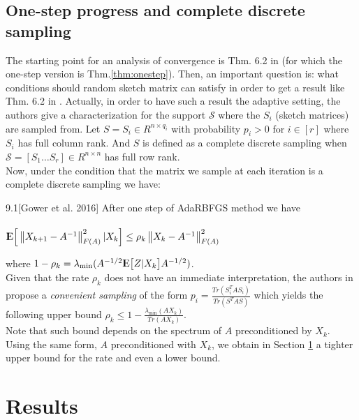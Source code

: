 \documentclass[12pt,conference,compsocconf]{IEEEtran}
\newcommand\norm[1]{\left\lVert#1\right\rVert}
\newcommand{\E}{{\rm I\kern-.3em E}}
\begin{document}
\subsection{One-step progress and complete discrete sampling}
The starting point for an analysis of convergence is Thm. 6.2 in \cite{Gower1} (for which the one-step version is Thm.\ref{thm:onestep}). Then, an important question is: what conditions should random sketch matrix can satisfy in order to get a result like Thm. 6.2 in \cite{Gower1}. Actually, in order to have such a result the adaptive setting, the authors give a characterization for the support $\mathcal{S}$ where the $S_i$ (sketch matrices) are sampled from. Let $S=S_i\in R^{n\times q_i}$ with probability $p_i>0$ for $i \in [r]$ where $S_i$ has full column rank. And $S$ is defined as a complete discrete sampling when $\mathcal{S}=[S_1\ldots S_r]\in R^{n\times n}$ has full row rank.\\
Now, under the condition that the matrix we sample at each iteration is a complete discrete sampling we have:
\begin{customthm}{9.1}[Gower et al. 2016]\label{thm:onestep}
After one step of AdaRBFGS method we have\\
\\
$\E\Big[\norm{X_{k+1}-A^{-1}}^2_{F(A)}|X_k\Big] \leq \rho _k\norm{X_k-A^{-1}}^2_{F(A)}$
\end{customthm}
where $1-\rho_k=\lambda_{\text{min}}(A^{-1/2}\E\big[Z|X_k\big]A^{-1/2})$.\\
Given that the rate $\rho_k$ does not have an immediate interpretation, the authors in \cite{Gower1} propose a \textit{convenient sampling} of the form $p_i=\frac{Tr(S_i^TAS_i)}{Tr(S^TAS)}$ which yields the following upper bound $\rho_k \leq 1-\frac{\lambda_{\text{min}}(AX_k)}{Tr(AX_k)}$.\\
Note that such bound depends on the spectrum of $A$ preconditioned by $X_k$. Using the same form, $A$ preconditioned with $X_k$, we obtain in Section \ref{sect:results} a tighter upper bound for the rate and even a lower bound.


\section{Results}\label{sect:results}
\end{document}
